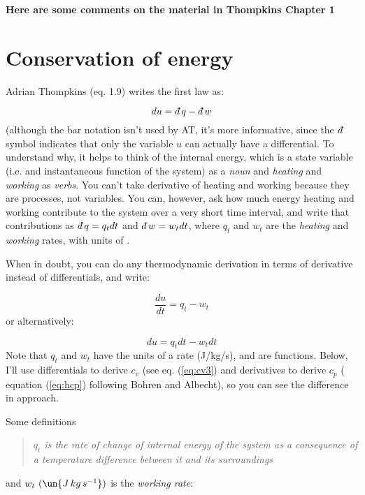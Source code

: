 \documentclass[12pt]{article}
\newcommand{\dbar}{d\mkern-6mu\mathchar'26}
\begin{document}
\newcommand{\vect}[1]{\boldsymbol{\vec{#1}}}
\pagestyle{first}


\textbf{Here are some comments on the material in Thompkins Chapter 1}

\section{Conservation of energy}

Adrian Thompkins (eq. 1.9) writes the first law as:


\begin{equation}
  \label{eq:firstwh}
  du = \dbar q - \dbar w
\end{equation}
(although the bar notation isn't used by AT, it's more informative, since
the $\dbar$ symbol indicates that only the variable $u$ can actually have 
a differential.  To understand why, it helps to think of the internal energy,
which is a state variable (i.e. and instantaneous function of the system) as
a \textit{noun} and \textit{heating} and \textit{working} as \textit{verbs}.
You can't take derivative of heating and working because they are processes,
not variables.    You can, however, ask how much energy heating and working
contribute to the system over a very short time interval, and write
that contributions as $\dbar q = q_t dt$ and $\dbar w= w_t dt$, where 
$q_t$ and $w_t$ are the \textit{heating } and \textit{working} rates, with
units of .

When in doubt, you can do any thermodynamic derivation in terms of
derivative instead of differentials, and write:

\begin{equation}
  \label{eq:first}
  \frac{du}{dt} = q_t - w_t
\end{equation}
or alternatively:

\begin{equation}
  \label{eq:firstb}
  du = q_t dt  - w_t dt
\end{equation}
Note that $q_t$ and $w_t$ have the units of a rate (J/kg/s), and are functions.
Below, I'll use differentials to derive $c_v$ (see eq. (\ref{eq:cv3}) and derivatives to derive $c_p$ (
equation (\ref{eq:hcp}) following Bohren and Albecht),
so you can see the difference in approach.

Some definitions

\begin{quote}
  \textit{$q_t$ is the rate of change of internal energy of the system as a consequence of
  a temperature difference between it and its surroundings}
\end{quote}
and $w_t\ (\un{J\,kg\,s^{-1}})$ is the \textit{working rate}:
\end{document}
